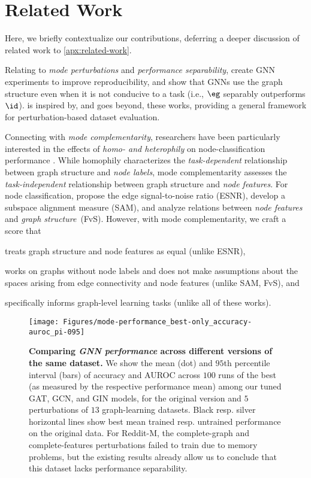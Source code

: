 \section{Related Work}
\label{sec:related}

Here, we briefly contextualize our contributions, deferring a deeper discussion of related work to \cref{apx:related-work}.

Relating to \emph{mode perturbations} and \emph{performance separability}, 
\citet{Errica20a} create GNN experiments to improve reproducibility, and \citet{Bechler-Speicher23a} show that GNNs use the graph structure even when it is not conducive to a task (i.e., $\eg$ separably outperforms $\id$). 
\framework is inspired by, and goes beyond, these works, 
providing a general framework for perturbation-based dataset evaluation. 

Connecting with \emph{mode complementarity}, 
researchers have been particularly interested in the effects of \emph{homo- and heterophily}
on node-classification performance  \citep{lim2021large,platonov2023characterizing,platonov2023critical,luan2023when}. 
While homophily characterizes the \emph{task-dependent} relationship between graph structure and \emph{node labels}, 
mode complementarity assesses the \emph{task-independent} relationship between graph structure and \emph{node features}. 
For node classification, 
\citet{dong2023understanding} propose the edge signal-to-noise ratio (ESNR), 
\citet{quian2022quantifying} develop a subspace alignment measure (SAM), 
and \citet{THANG202246} analyze relations between \emph{node features} and \emph{graph structure}~(FvS).
However, with mode complementarity, we craft a score that 
\begin{inparaenum}[(1)]
	\item treats graph structure and node features as equal (unlike ESNR), 
  \item works on graphs without node labels and does not make assumptions about the spaces arising from edge connectivity and node features (unlike SAM, FvS), and 
	\item specifically informs graph-level learning tasks (unlike all of these works).
\end{inparaenum}
 
\begin{figure*}[!t]
	\centering
	\texttt{[image: Figures/mode-performance\_best-only\_accuracy-auroc\_pi-095]}
	\caption{\textbf{Comparing \emph{GNN performance} across different versions of the same dataset.} 
		We show the mean (dot) and $95$th percentile interval (bars) of accuracy and AUROC across $100$ runs of the best (as measured by the respective performance mean) among our tuned GAT, GCN, and GIN models,
		for the original version and $5$ perturbations of $13$ graph-learning datasets.
		Black resp. silver horizontal lines show best mean trained resp. untrained performance on the original data. 
		For Reddit-M, the complete-graph and complete-features perturbations failed to train due to memory problems, 
		but the existing results already allow us to conclude that this dataset lacks performance separability.
		\label{fig:performance-separability}}
\end{figure*}

